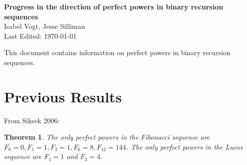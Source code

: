 \documentclass[12pt]{article}
\newtheorem{thm}{Theorem}[section]
\begin{document}
\begin{center}
{\bf \large{Progress in the direction of perfect powers in binary recursion sequences}} \\
\smallskip
Isabel Vogt, Jesse Silliman\\
Last Edited: \today \\
\end{center}

This document contains information on perfect powers in binary recursion sequences.

\section{Previous Results}

From Siksek 2006:

\begin{thm}\label{fibluc}
The only perfect powers in the Fibonacci sequence are $F_0 = 0, F_1 = 1, F_2 = 1, F_6 = 8, F_{12} = 144$.  The only perfect powers in the Lucas sequence are $F_1 = 1$ and $F_3 = 4$. 
\end{thm}
\end{document}
